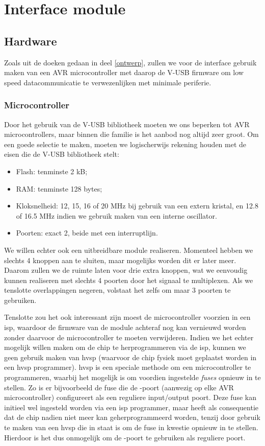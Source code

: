 \part{Interface module}
\label{interface}

\chapter{Hardware}

Zoals uit de doeken gedaan in deel \ref{ontwerp}, zullen we voor de interface gebruik maken van een AVR microcontroller met daarop de V-USB firmware om low speed datacommunicatie te verwezenlijken met minimale periferie.

\section{Microcontroller}

Door het gebruik van de V-USB bibliotheek moeten we ons beperken tot AVR microcontrollers, maar binnen die familie is het aanbod nog altijd zeer groot. Om een goede selectie te maken, moeten we logischerwijs rekening houden met de eisen die de V-USB bibliotheek stelt:
\begin{itemize}
\item Flash: tenminste 2 kB;
\item RAM: tenminste 128 bytes;
\item Kloksnelheid: 12, 15, 16 of 20 MHz bij gebruik van een extern kristal, en 12.8 of 16.5 MHz indien we gebruik maken van een interne oscillator.
\item Poorten: exact 2, beide met een interruptlijn.
\end{itemize}

We willen echter ook een uitbreidbare module realiseren. Momenteel hebben we slechts 4 knoppen aan te sluiten, maar mogelijks worden dit er later meer. Daarom zullen we de ruimte laten voor drie extra knoppen, wat we eenvoudig kunnen realiseren met slechts 4 poorten door het signaal te multiplexen. Als we tenslotte overlappingen negeren, volstaat het zelfs om maar 3 poorten te gebruiken.

Tenslotte zou het ook interessant zijn moest de microcontroller voorzien in een \ac{isp}, waardoor de firmware van de module achteraf nog kan vernieuwd worden zonder daarvoor de microcontroller te moeten verwijderen. Indien we het echter mogelijk willen maken om de chip te herprogrammeren via de \ac{isp}, kunnen we geen gebruik maken van \ac{hvsp} (waarvoor de chip fysiek moet geplaatst worden in een \ac{hvsp} programmer). \ac{hvsp} is een speciale methode om een microcontroller te programmeren, waarbij het mogelijk is om voordien ingestelde \emph{fuses} opnieuw in te stellen. Zo is er bijvoorbeeld de fuse die de -poort (aanwezig op elke AVR microcontroller) configureert als een reguliere input/output poort. Deze fuse kan initieel wel ingesteld worden via een \ac{isp} programmer, maar heeft als consequentie dat de chip nadien niet meer kan geherprogrammeerd worden, tenzij door gebruik te maken van een \ac{hvsp} die in staat is om de fuse in kwestie opnieuw in te stellen. Hierdoor is het dus onmogelijk om de -poort te gebruiken als reguliere poort.

